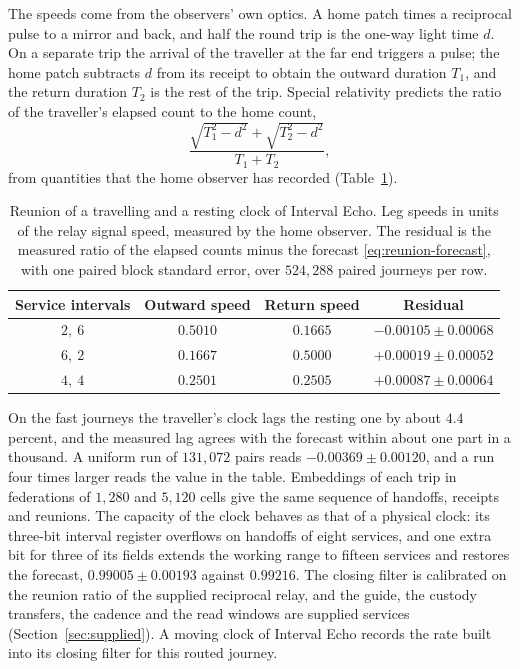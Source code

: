\documentclass[11pt]{article}
\theoremstyle{definition}
\theoremstyle{remark}
\begin{document}
The speeds come from the observers' own optics. A home patch times a
reciprocal pulse to a mirror and back, and half the round trip is the
one-way light time $d$. On a separate trip the arrival of the traveller at
the far end triggers a pulse; the home patch subtracts $d$ from its receipt
to obtain the outward duration $T_1$, and the return duration $T_2$ is the
rest of the trip. Special relativity predicts the ratio of the traveller's
elapsed count to the home count,
\begin{equation}
 \frac{\sqrt{T_1^2-d^2}+\sqrt{T_2^2-d^2}}{T_1+T_2},
\label{eq:reunion-forecast}
\end{equation}
from quantities that the home observer has recorded
(Table~\ref{tab:reunion}).

\begin{table}[htbp]
\centering\small
\caption{Reunion of a travelling and a resting clock of Interval Echo. Leg
speeds in units of the relay signal speed, measured by the home observer.
The residual is the measured ratio of the elapsed counts minus the forecast
\eqref{eq:reunion-forecast}, with one paired block standard error, over
$524{,}288$ paired journeys per row.}
\label{tab:reunion}
\begin{tabular}{@{}cccc@{}}
\toprule
\textbf{Service intervals} & \textbf{Outward speed} & \textbf{Return speed} & \textbf{Residual}\\
\midrule
$2,\ 6$ & $0.5010$ & $0.1665$ & $-0.00105\pm0.00068$\\
$6,\ 2$ & $0.1667$ & $0.5000$ & $+0.00019\pm0.00052$\\
$4,\ 4$ & $0.2501$ & $0.2505$ & $+0.00087\pm0.00064$\\
\bottomrule
\end{tabular}
\end{table}

On the fast journeys the traveller's clock lags the resting one by about
$4.4$ percent, and the measured lag agrees with the forecast
within about one part in a thousand. A uniform run of $131{,}072$ pairs
reads $-0.00369\pm0.00120$, and a run four times larger reads the value
in the table. Embeddings of each trip in
federations of $1{,}280$ and $5{,}120$ cells give the same sequence of
handoffs, receipts and reunions. The capacity of the clock behaves as
that of a physical clock: its three-bit interval register overflows on
handoffs of eight services, and one extra bit for three of its fields
extends the working range to fifteen services and restores the forecast,
$0.99005\pm0.00193$ against $0.99216$. The closing
filter is calibrated on the reunion ratio of the supplied reciprocal relay,
and the guide, the custody transfers, the cadence and the read windows are
supplied services (Section~\ref{sec:supplied}). A moving clock of Interval
Echo records the rate built into its closing filter for this routed journey.
\end{document}
